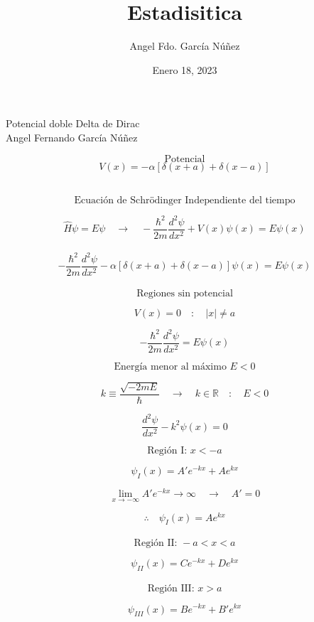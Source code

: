 \documentclass[10pt,a4papper]{article}
\author{Angel Fdo. García Núñez}
\date{Enero 18, 2023}
\title{Estadisitica}
\begin{document}
\Huge
Potencial doble Delta de Dirac\\

Angel Fernando García Núñez

\Large
\newpage
\[\text{Potencial}\]
\[V(x)=-\alpha[\delta(x+a)+\delta(x-a)]\]

\begin{center}
\end{center}\\


\[\text{Ecuación de Schrödinger Independiente del tiempo}\]

\[\hat H\psi=E\psi\quad\to\quad
-\frac{\hbar^2}{2m}\frac{d^2\psi}{dx^2}+V(x)\psi(x)=E\psi(x)\]\\

\[-\frac{\hbar^2}{2m}\frac{d^2\psi}{dx^2}-\alpha[\delta(x+a)+\delta(x-a)]\psi(x)=E\psi(x)\]\\

\[\text{Regiones sin potencial}\]

\[V(x)=0\quad:\quad |x|\not=a\]

\[-\frac{\hbar^2}{2m}\frac{d^2\psi}{dx^2}=E\psi(x)\]

\[\text{Energía menor al máximo }E<0\]

\[k\equiv\frac{\sqrt{-2mE}}{\hbar}\quad\to\quad k\in\mathbb{R}\quad:\quad E<0\]

\[\boxed{\frac{d^2\psi}{dx^2}-k^2\psi(x)=0}\]

\newpage
\[\text{Región I: }x<-a\]

\[\psi_I(x)=A'e^{-kx}+Ae^{kx}\]

\[\lim_{x\to-\infty}A'e^{-kx}\to\infty\quad\to\quad A'=0\]

\[\therefore\quad\psi_I(x)=Ae^{kx}\]\\

\[\text{Región II: }-a<x<a\]

\[\psi_{II}(x)=Ce^{-kx}+De^{kx}\]\\

\[\text{Región III: }x>a\]

\[\psi_{III}(x)=Be^{-kx}+B'e^{kx}\]
\end{document}
